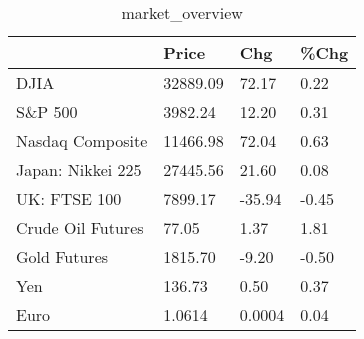 \documentclass{article}%
\begin{document}
%


\begin{table}[htbp]%
\caption{market\_overview}%
\centering%
\begin{adjustbox}{width=1\textwidth}%
\begin{tabular}{llll}
\toprule
                  &    Price &    Chg &  \%Chg \\
\midrule
             DJIA & 32889.09 &  72.17 &  0.22 \\
          S\&P 500 &  3982.24 &  12.20 &  0.31 \\
 Nasdaq Composite & 11466.98 &  72.04 &  0.63 \\
Japan: Nikkei 225 & 27445.56 &  21.60 &  0.08 \\
     UK: FTSE 100 &  7899.17 & -35.94 & -0.45 \\
Crude Oil Futures &    77.05 &   1.37 &  1.81 \\
     Gold Futures &  1815.70 &  -9.20 & -0.50 \\
              Yen &   136.73 &   0.50 &  0.37 \\
             Euro &   1.0614 & 0.0004 &  0.04 \\
\bottomrule
\end{tabular}
%
\end{adjustbox}%
\end{table}

%
\end{document}
